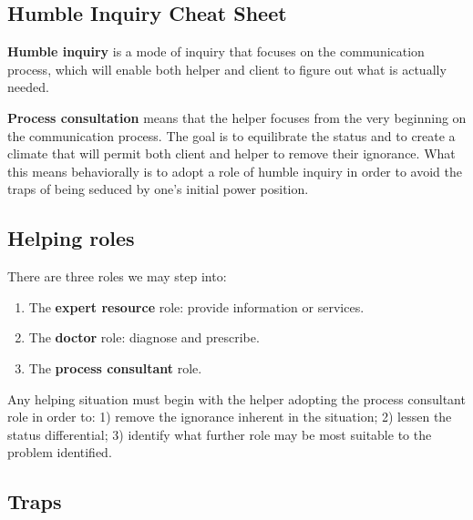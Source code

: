 \documentclass{article}
\newenvironment{nosepenumerate}
{ \begin{enumerate}
    \setlength{\itemsep}{0pt}
    \setlength{\parskip}{0pt}
    \setlength{\parsep}{0pt}     }
{ \end{enumerate}                  }
\begin{document}
\begin{center}
     \section{Humble Inquiry Cheat Sheet}
\end{center}

\begin{multicols}{2}

\noindent
\textbf{Humble inquiry} is a mode of inquiry that focuses on the communication process, which will enable both helper and client to figure out what is actually needed.

\textbf{Process consultation} means that the helper focuses from the very beginning on the communication process. The goal is to equilibrate the status and to create a climate that will permit both client and helper to remove their ignorance. What this means behaviorally is to adopt a role of humble inquiry in order to avoid the traps of being seduced by one's initial power position.

\end{multicols}

\begin{center}
\section{Helping roles}
\end{center}

\begin{multicols}{2}

\noindent
There are three roles we may step into:

\begin{nosepenumerate}
    \item The \textbf{expert resource} role: provide information or services.
    \item The \textbf{doctor} role: diagnose and prescribe.
    \item The \textbf{process consultant} role.
\end{nosepenumerate}

Any helping situation must begin with the helper adopting the process consultant role in order to: 1) remove the ignorance inherent in the situation; 2) lessen the status differential; 3) identify what further role may be most suitable to the problem identified.

\end{multicols}

\begin{center}
\section{Traps}
\end{center}
\end{document}

